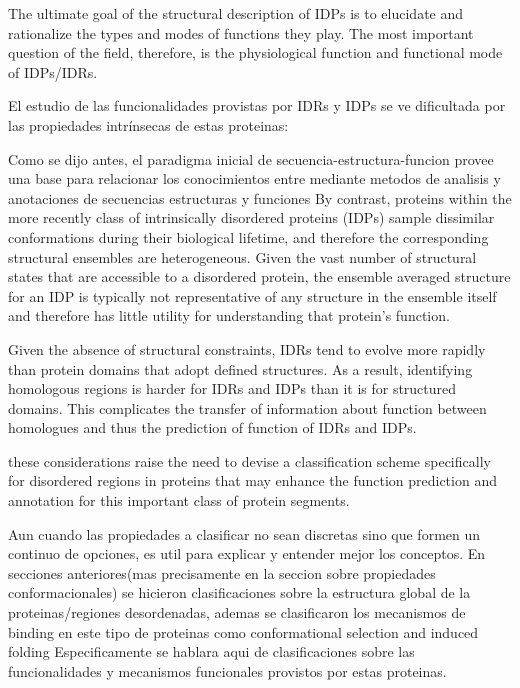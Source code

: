 
The ultimate goal of the structural description of IDPs is to elucidate and rationalize the types and modes of functions they play.
The most important question of the field, therefore, is the physiological function and functional mode of IDPs/IDRs.


El estudio de las funcionalidades provistas por IDRs y IDPs se ve dificultada por las propiedades intrínsecas de estas proteinas:
% 


Como se dijo antes, el paradigma inicial de secuencia-estructura-funcion provee una base para relacionar los conocimientos entre mediante metodos de analisis y anotaciones de secuencias estructuras y funciones 
By contrast, proteins within the more recently class of intrinsically disordered proteins (IDPs) sample dissimilar conformations during their biological lifetime, and therefore the corresponding structural
ensembles are heterogeneous. Given the vast number of structural states that are accessible to a disordered protein, the ensemble averaged structure for an IDP is typically not representative of any structure in 
the ensemble itself and therefore has little utility for understanding that protein's function.

Given the absence of structural constraints, IDRs tend to evolve more rapidly than protein domains that adopt defined structures. 
As a result, identifying homologous regions is harder for IDRs and IDPs than it is for structured domains.
This complicates the transfer of
information about function between homologues and thus the
prediction of function of IDRs and IDPs.

these
considerations raise the need to devise a classification scheme
specifically for disordered regions in proteins that may enhance
the function prediction and annotation for this important class of
protein segments.

Aun cuando las propiedades a clasificar no sean discretas sino que formen un continuo de opciones, es util para explicar y entender mejor los conceptos.
En secciones anteriores(mas precisamente en la seccion sobre propiedades conformacionales) se hicieron clasificaciones sobre la estructura global de la proteinas/regiones desordenadas, 
ademas se clasificaron los mecanismos de binding en este tipo de proteinas como conformational selection and induced folding
Especificamente se hablara aqui de clasificaciones sobre las funcionalidades y mecanismos funcionales provistos por estas proteinas.

